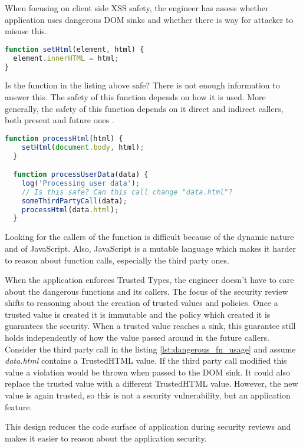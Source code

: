 When focusing on client side XSS safety, the engineer has assess whether application uses dangerous
DOM sinks and whether there is way for attacker to misuse this.

\bigskip
\begin{lstlisting}[language=JavaScript, caption=Possibly dangerous function]
function setHtml(element, html) {
  element.innerHTML = html;
}
\end{lstlisting}

Is the function in the listing above safe? There is not enough information to answer this. The
safety of this function depends on how it is used. More generally, the safety of this function
depends on it direct and indirect callers, both present and future ones \cite{tt_design_history}.

\bigskip
\begin{lstlisting}[language=JavaScript, caption=Usage of the possibly dangerous function, label={lst:dangerous_fn_usage}]
  function processHtml(html) {
    setHtml(document.body, html);
  }

  function processUserData(data) {
    log('Processing user data');
    // Is this safe? Can this call change "data.html"?
    someThirdPartyCall(data);
    processHtml(data.html);
  }
\end{lstlisting}

Looking for the callers of the function is difficult because of the dynamic nature and of
JavaScript. Also, JavaScript is a mutable language which makes it harder to reason about function
calls, especially the third party ones.

When the application enforces Trusted Types, the engineer doesn't have to care about the dangerous
functions and its callers. The focus of the security review shifts to reasoning about the creation
of trusted values and policies. Once a trusted value is created it is immutable and the policy which
created it is guarantees the security. When a trusted value reaches a sink, this guarantee still
holds independently of how the value passed around in the future callers. Consider the third party
call in the listing \ref{lst:dangerous_fn_usage} and assume \textit{data.html} contains a
TrustedHTML value. If the third party call modified this value a violation would be thrown when
passed to the DOM sink. It could also replace the trusted value with a different TrustedHTML value.
However, the new value is again trusted, so this is not a security vulnerability, but an application
feature.

This design reduces the code surface of application during security reviews and makes it easier to
reason about the application security.

